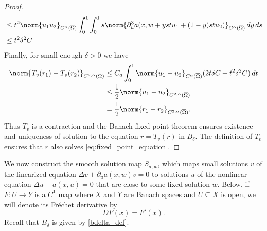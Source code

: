 \documentclass[11pt,a4paper]{amsart}
\theoremstyle{definition}
\numberwithin{equation}{section}
\newcommand{\ol}[1]{\overline{#1}}
\newcommand{\p}{\partial}
\newcommand{\half}{\frac{1}{2}}
\newcommand{\Om}{\Omega}
\begin{document}
\begin{proof}
\begin{equation*}
\begin{aligned}
	&\leq t^2\norm{u_1u_2}_{C^{\alpha}(\ol{\Om})}\int_0^1\int_0^1 s \norm{\partial_u^3a(x,w + y s t u_1+(1-y)st u_2)}_{C^{\alpha}(\ol{\Om})}\,dy\,ds \\
	&\leq t^2\delta^2C
\end{aligned}
\end{equation*}
Finally, for small enough $\delta>0$ we have 
\begin{equation*}
\begin{aligned}
	\norm{T_v(r_1) - T_v(r_2)}_{C^{2,\alpha}(\Om)} &\leq C_a \int_0^1\norm{u_1-u_2}_{C^{\alpha}(\ol{\Om})} (2t\delta C + t^2\delta^2C)\,dt\\
	&\leq \half\norm{u_1 - u_2}_{C^{2,\alpha}(\ol{\Om})} \\
	&= \half\norm{r_1 - r_2}_{C^{2,\alpha}(\ol{\Om})}.
\end{aligned}
\end{equation*}
Thus $T_v$ is a contraction and the Banach fixed point theorem ensures existence and uniqueness of solution to the equation $r = T_v(r)$ in $B_{\delta}$. The definition of $T_v$ ensures that $r$ also solves \eqref{eq:fixed_point_equation}.
\end{proof}

We now construct the smooth solution map $S_{a,w}$, which maps small solutions $v$ of the linearized equation $\Delta v + \p_u a(x,w)v = 0$ to solutions $u$ of the nonlinear equation $\Delta u + a(x,u) = 0$ that are close to some fixed solution \( w \). Below, if $F: U \to Y$ is a $C^1$ map where $X$ and $Y$ are Banach spaces and $U \subseteq X$ is open, we will denote its Fréchet derivative by 
\[
DF(x) = F'(x).
\]
Recall that $B_{\delta}$ is given by \eqref{bdelta_def}.
\end{document}
